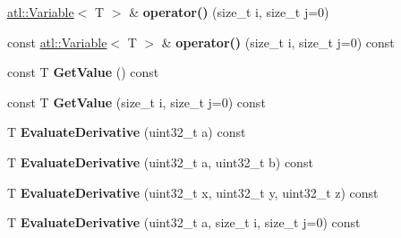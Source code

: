 \begin{DoxyCompactItemize}
\item 
\hypertarget{structatl_1_1_fast_variable_matrix_acc839a5c65857c92db2334211f396406}{\hyperlink{structatl_1_1_variable}{atl\+::\+Variable}$<$ T $>$ \& {\bfseries operator()} (size\+\_\+t i, size\+\_\+t j=0)}\label{structatl_1_1_fast_variable_matrix_acc839a5c65857c92db2334211f396406}

\item 
\hypertarget{structatl_1_1_fast_variable_matrix_ad6d07f68200eabfc5d08a899ed5374fb}{const \hyperlink{structatl_1_1_variable}{atl\+::\+Variable}$<$ T $>$ \& {\bfseries operator()} (size\+\_\+t i, size\+\_\+t j=0) const }\label{structatl_1_1_fast_variable_matrix_ad6d07f68200eabfc5d08a899ed5374fb}

\item 
\hypertarget{structatl_1_1_fast_variable_matrix_ac1fac676e85f15f4a449daf2743b4ada}{const T {\bfseries Get\+Value} () const }\label{structatl_1_1_fast_variable_matrix_ac1fac676e85f15f4a449daf2743b4ada}

\item 
\hypertarget{structatl_1_1_fast_variable_matrix_afa69688b8746f6df926e7157bba7d1ee}{const T {\bfseries Get\+Value} (size\+\_\+t i, size\+\_\+t j=0) const }\label{structatl_1_1_fast_variable_matrix_afa69688b8746f6df926e7157bba7d1ee}

\item 
\hypertarget{structatl_1_1_fast_variable_matrix_ab4a1d0ed1ab6ca7bbf3e5fd46d99a037}{T {\bfseries Evaluate\+Derivative} (uint32\+\_\+t a) const }\label{structatl_1_1_fast_variable_matrix_ab4a1d0ed1ab6ca7bbf3e5fd46d99a037}

\item 
\hypertarget{structatl_1_1_fast_variable_matrix_a1d9897ad78586dadfa88cecef82b7d65}{T {\bfseries Evaluate\+Derivative} (uint32\+\_\+t a, uint32\+\_\+t b) const }\label{structatl_1_1_fast_variable_matrix_a1d9897ad78586dadfa88cecef82b7d65}

\item 
\hypertarget{structatl_1_1_fast_variable_matrix_a9ed8f0a5e022e4c6422ac477b79ec08e}{T {\bfseries Evaluate\+Derivative} (uint32\+\_\+t x, uint32\+\_\+t y, uint32\+\_\+t z) const }\label{structatl_1_1_fast_variable_matrix_a9ed8f0a5e022e4c6422ac477b79ec08e}

\item 
\hypertarget{structatl_1_1_fast_variable_matrix_a33afd05d2c83c1fb044c7e71c1d0523b}{T {\bfseries Evaluate\+Derivative} (uint32\+\_\+t a, size\+\_\+t i, size\+\_\+t j=0) const }\label{structatl_1_1_fast_variable_matrix_a33afd05d2c83c1fb044c7e71c1d0523b}


\end{DoxyCompactItemize}
